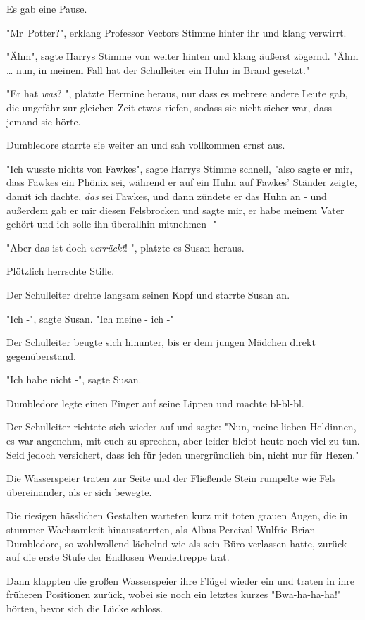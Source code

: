 {Es gab eine Pause.

"Mr~Potter?", erklang Professor Vectors Stimme hinter ihr und klang verwirrt.

"Ähm", sagte Harrys Stimme von weiter hinten und klang äußerst zögernd. "Ähm … nun, in meinem Fall hat der Schulleiter ein Huhn in Brand gesetzt."

"Er hat \emph{was}? ", platzte Hermine heraus, nur dass es mehrere andere Leute gab, die ungefähr zur gleichen Zeit etwas riefen, sodass sie nicht sicher war, dass jemand sie hörte.

Dumbledore starrte sie weiter an und sah vollkommen ernst aus.

"Ich wusste nichts von Fawkes", sagte Harrys Stimme schnell, "also sagte er mir, dass Fawkes ein Phönix sei, während er auf ein Huhn auf Fawkes' Ständer zeigte, damit ich dachte, \emph{das} sei Fawkes, und dann zündete er das Huhn an - und außerdem gab er mir diesen Felsbrocken und sagte mir, er habe meinem Vater gehört und ich solle ihn überallhin mitnehmen -"

"Aber das ist doch \emph{verrückt}! ", platzte es Susan heraus.

Plötzlich herrschte Stille.

Der Schulleiter drehte langsam seinen Kopf und starrte Susan an.

"Ich -", sagte Susan. "Ich meine - ich -"

Der Schulleiter beugte sich hinunter, bis er dem jungen Mädchen direkt gegenüberstand.

"Ich habe nicht -", sagte Susan.

Dumbledore legte einen Finger auf seine Lippen und machte bl-bl-bl.

Der Schulleiter richtete sich wieder auf und sagte: "Nun, meine lieben Heldinnen, es war angenehm, mit euch zu sprechen, aber leider bleibt heute noch viel zu tun. Seid jedoch versichert, dass ich für jeden unergründlich bin, nicht nur für Hexen."

Die Wasserspeier traten zur Seite und der Fließende Stein rumpelte wie Fels übereinander, als er sich bewegte.

Die riesigen hässlichen Gestalten warteten kurz mit toten grauen Augen, die in stummer Wachsamkeit hinausstarrten, als Albus Percival Wulfric Brian Dumbledore, so wohlwollend lächelnd wie als sein Büro verlassen hatte, zurück auf die erste Stufe der Endlosen Wendeltreppe trat.

Dann klappten die großen Wasserspeier ihre Flügel wieder ein und traten in ihre früheren Positionen zurück, wobei sie noch ein letztes kurzes "Bwa-ha-ha-ha!" hörten, bevor sich die Lücke schloss.

}
